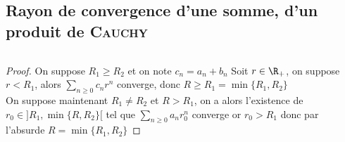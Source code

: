 	\subsection{Rayon de convergence d'une somme, d'un produit de \textsc{Cauchy}}
		${}$ \\ 
		\begin{proof}
		On suppose $R_1\geq R_2$ et on note $c_n=a_n+b_n$ 
		Soit $r\in\R_+$, on suppose $r<R_1$, alors $\sum_{n\geq 0} c_nr^n$ converge, donc $R\geq R_1 = \min\{R_1,R_2\}$ \\
		On suppose maintenant $R_1\neq R_2$ et $R>R_1$, on a alors l'existence de $r_0\in ]R_1,\min\{R,R_2\}[ $ tel que $\sum_{n\geq 0} a_n r_0^n$ converge or $r_0>R_1$ donc par l'absurde $R=\min\{R_1,R_2\}$ 
		\end{proof} ${}$\\ \traitd
